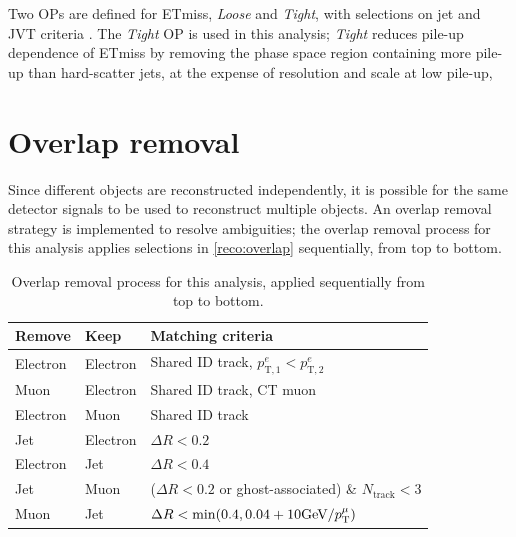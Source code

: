 \documentclass[../thesis.tex]{subfiles}
\begin{document}
Two \acs{OP}s are defined for \acs{ETmiss}, \textit{Loose} and \textit{Tight}, with selections on jet \pT and JVT criteria \citep{reco:met2}. The \textit{Tight} \acs{OP} is used in this analysis; \textit{Tight} reduces pile-up dependence of \acs{ETmiss} by removing the phase space region containing more pile-up than hard-scatter jets, at the expense of resolution and scale at low pile-up,

\section{Overlap removal}
Since different objects are reconstructed independently, it is possible for the same detector signals to be used to reconstruct multiple objects. An overlap removal strategy is implemented to resolve ambiguities; the overlap removal process for this analysis applies selections in \autoref{reco:overlap} sequentially, from top to bottom.

\begin{table}[!ht]
\centering
\caption{\label{reco:overlap}Overlap removal process for this analysis, applied sequentially from top to bottom.}%
\begin{tabular}{lll}
\toprule
Remove		& Keep		& Matching criteria \\
\midrule
Electron	& Electron 	& Shared ID track, $p^e_\mathrm{T,1}<p^e_\mathrm{T,2}$ \\
Muon		& Electron	& Shared ID track, CT muon \\
Electron	& Muon		& Shared ID track \\
Jet			& Electron	& $\Delta R <0.2$ \\
Electron	& Jet		& $\Delta R <0.4$ \\
Jet			& Muon		& ($\Delta R <0.2$ or ghost-associated) \& $N_\text{track}<3$ \\
Muon		& Jet		& $\Delta R < \min(0.4, 0.04+10 \text{GeV/\ensuremath{p_\mathrm{T}^\mu}})$ \\
\bottomrule
\end{tabular}
\end{table}
\end{document}
